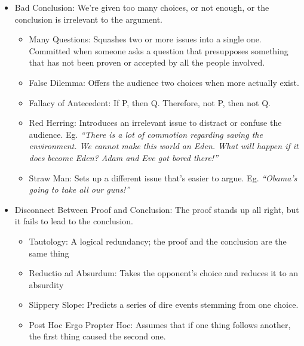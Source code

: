 \begin{itemize}
	\item Bad Conclusion: We're given too many choices, or not enough, or the conclusion is irrelevant to the argument.
		\begin{itemize}
			\item Many Questions: Squashes two or more issues into a single one. Committed when someone asks a question that presupposes something that has not been proven or accepted by all the people involved.
			\item False Dilemma: Offers the audience two choices when more actually exist.
			\item Fallacy of Antecedent: If P, then Q. Therefore, not P, then not Q.
			\item Red Herring: Introduces an irrelevant issue to distract or confuse the audience. Eg. \emph{``There is a lot of commotion regarding saving the environment. We cannot make this world an Eden. What will happen if it does become Eden? Adam and Eve got bored there!''}
			\item Straw Man: Sets up a different issue that's easier to argue. Eg. \emph{``Obama's going to take all our guns!''}
		\end{itemize}
	\item Disconnect Between Proof and Conclusion: The proof stands up all right, but it fails to lead to the conclusion.
		\begin{itemize}
			\item Tautology: A logical redundancy; the proof and the conclusion are the same thing
			\item Reductio ad Absurdum: Takes the opponent's choice and reduces it to an absurdity
			\item Slippery Slope: Predicts a series of dire events stemming from one choice.
			\item Post Hoc Ergo Propter Hoc: Assumes that if one thing follows another, the first thing caused the second one.
		\end{itemize}
\end{itemize}

